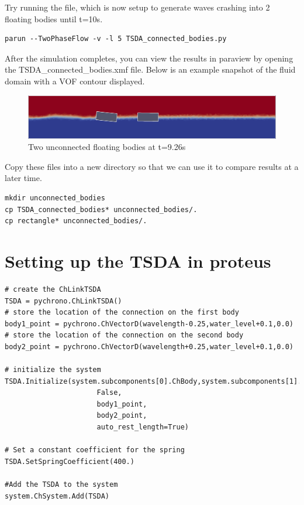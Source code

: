 \documentclass{report}
\begin{document}
\newpage 
\noindent Try running the file, which is now setup to generate waves crashing into 2 floating bodies until t=10s.
{\color{myred}
\begin{verbatim}
parun --TwoPhaseFlow -v -l 5 TSDA_connected_bodies.py        	
\end{verbatim} 
}
\noindent After the simulation completes, you can view the results in paraview by opening the TSDA\_connected\_bodies.xmf file. Below is an example snapshot of the fluid domain with a VOF contour displayed. \newline
\begin{figure}[h]
  \centering
  \includegraphics[width=15cm]{2_floating_bodies_2.png}
  \setcaptionwidth{13cm}
  \caption{Two unconnected floating bodies at t=9.26s}
  \label{floating_body}
\end{figure}

\noindent Copy these files into a new directory so that we can use it to compare results at a later time.
{
\color{myred}
\begin{verbatim}
mkdir unconnected_bodies
cp TSDA_connected_bodies* unconnected_bodies/.
cp rectangle* unconnected_bodies/.
\end{verbatim} 
}
\newpage
\section{Setting up the TSDA in proteus}
\begin{lstlisting}
# create the ChLinkTSDA
TSDA = pychrono.ChLinkTSDA() 
# store the location of the connection on the first body
body1_point = pychrono.ChVectorD(wavelength-0.25,water_level+0.1,0.0)  
# store the location of the connection on the second body
body2_point = pychrono.ChVectorD(wavelength+0.25,water_level+0.1,0.0)   

# initialize the system
TSDA.Initialize(system.subcomponents[0].ChBody,system.subcomponents[1].ChBody,
                      False,
                      body1_point, 
                      body2_point, 
                      auto_rest_length=True)

# Set a constant coefficient for the spring
TSDA.SetSpringCoefficient(400.)

#Add the TSDA to the system
system.ChSystem.Add(TSDA)
\end{lstlisting}
\newpage
\end{document}

